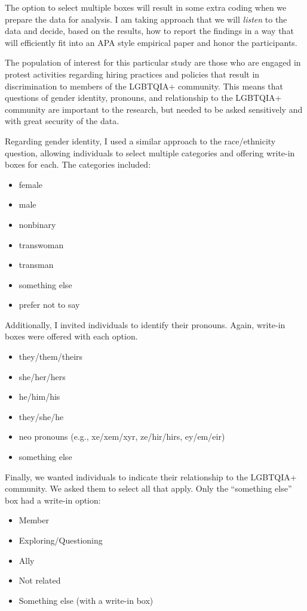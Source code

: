 \documentclass[
  english,
]{book}
\providecommand{\tightlist}{%
  \setlength{\itemsep}{0pt}\setlength{\parskip}{0pt}}
\begin{document}
The option to select multiple boxes will result in some extra coding when we prepare the data for analysis. I am taking approach that we will \emph{listen} to the data and decide, based on the results, how to report the findings in a way that will efficiently fit into an APA style empirical paper and honor the participants.

The population of interest for this particular study are those who are engaged in protest activities regarding hiring practices and policies that result in discrimination to members of the LGBTQIA+ community. This means that questions of gender identity, pronouns, and relationship to the LGBTQIA+ community are important to the research, but needed to be asked sensitively and with great security of the data.

Regarding gender identity, I used a similar approach to the race/ethnicity question, allowing individuals to select multiple categories and offering write-in boxes for each. The categories included:

\begin{itemize}
\tightlist
\item
  female
\item
  male
\item
  nonbinary
\item
  transwoman
\item
  transman
\item
  something else
\item
  prefer not to say
\end{itemize}

Additionally, I invited individuals to identify their pronouns. Again, write-in boxes were offered with each option.

\begin{itemize}
\tightlist
\item
  they/them/theirs
\item
  she/her/hers
\item
  he/him/his
\item
  they/she/he
\item
  neo pronouns (e.g., xe/xem/xyr, ze/hir/hirs, ey/em/eir)
\item
  something else
\end{itemize}

Finally, we wanted individuals to indicate their relationship to the LGBTQIA+ community. We asked them to select all that apply. Only the ``something else'' box had a write-in option:

\begin{itemize}
\tightlist
\item
  Member
\item
  Exploring/Questioning
\item
  Ally
\item
  Not related
\item
  Something else (with a write-in box)
\end{itemize}
\end{document}
